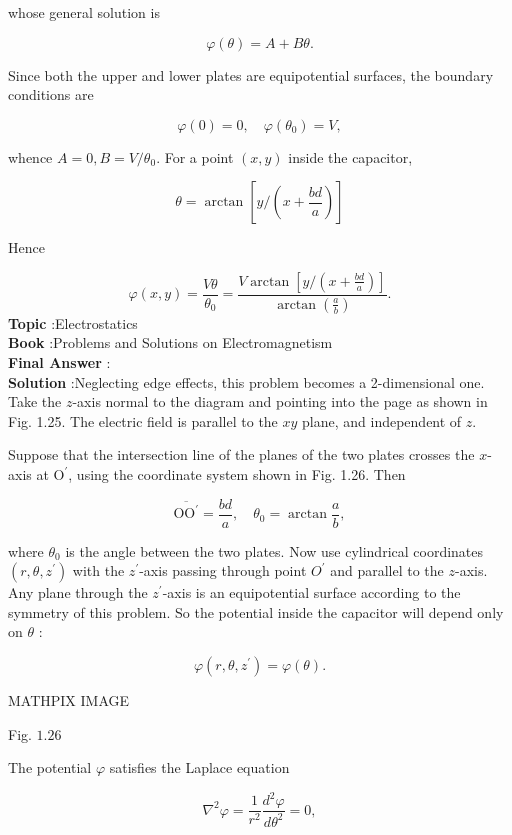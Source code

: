 \documentclass[10pt]{article}
\begin{document}
whose general solution is

$$
\varphi(\theta)=A+B \theta .
$$

Since both the upper and lower plates are equipotential surfaces, the boundary conditions are

$$
\varphi(0)=0, \quad \varphi\left(\theta_{0}\right)=V,
$$

whence $A=0, B=V / \theta_{0}$. For a point $(x, y)$ inside the capacitor,

$$
\theta=\arctan \left[y /\left(x+\frac{b d}{a}\right)\right]
$$

Hence

$$
\varphi(x, y)=\frac{V \theta}{\theta_{0}}=\frac{V \arctan \left[y /\left(x+\frac{b d}{a}\right)\right]}{\arctan \left(\frac{a}{b}\right)} .
$$
\textbf{Topic} :Electrostatics\\
\textbf{Book} :Problems and Solutions on Electromagnetism\\
\textbf{Final Answer} :\\


\textbf{Solution} :Neglecting edge effects, this problem becomes a 2-dimensional one. Take the $z$-axis normal to the diagram and pointing into the page as shown in Fig. 1.25. The electric field is parallel to the $x y$ plane, and independent of $z$.

Suppose that the intersection line of the planes of the two plates crosses the $x$-axis at $\mathrm{O}^{\prime}$, using the coordinate system shown in Fig. 1.26. Then

$$
\overline{\mathrm{OO}^{\prime}}=\frac{b d}{a}, \quad \theta_{0}=\arctan \frac{a}{b},
$$

where $\theta_{0}$ is the angle between the two plates. Now use cylindrical coordinates $\left(r, \theta, z^{\prime}\right)$ with the $z^{\prime}$-axis passing through point $O^{\prime}$ and parallel to the $z$-axis. Any plane through the $z^{\prime}$-axis is an equipotential surface according to the symmetry of this problem. So the potential inside the capacitor will depend only on $\theta$ :

$$
\varphi\left(r, \theta, z^{\prime}\right)=\varphi(\theta) .
$$

MATHPIX IMAGE

Fig. $1.26$

The potential $\varphi$ satisfies the Laplace equation

$$
\nabla^{2} \varphi=\frac{1}{r^{2}} \frac{d^{2} \varphi}{d \theta^{2}}=0,
$$
\end{document}
